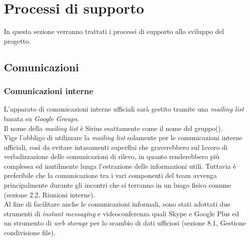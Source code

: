 \section{Processi di supporto}
In questa sezione verranno trattati i processi di supporto allo sviluppo del progetto.
\subsection{Comunicazioni}
\subsubsection{Comunicazioni interne}
L'apparato di comunicazioni interne ufficiali sarà gestito tramite una \textit{mailing list} basata su \textit{Google Groups}.\\
Il nome della \textit{mailing list} è Sirius esattamente come il nome del gruppo(\gruppo).\\ Vige l'obbligo di utilizzare la \textit{mailing list} solamente per le comunicazioni interne ufficiali, così da evitare intasamenti superflui che graverebbero sul lavoro di verbalizzazione delle comunicazioni di rilevo, in quanto renderebbero più complessa ed inutilmente lunga l'estrazione delle informazioni utili. Tuttavia è preferibile che la comunicazione tra i vari componenti del team avvenga principalmente durante gli incontri che si terranno in un luogo fisico comune (sezione 2.2, Riunioni interne).\\
Al fine di facilitare anche le comunicazioni informali, sono stati adottati due strumenti di \textit{instant messaging} e videoconferenza quali Skype e Google Plus ed un strumento di \textit{web storage} per lo scambio di dati ufficiosi (sezione 8.1, Gestione condivisione file).

